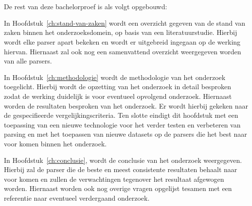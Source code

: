 \section{}
\label{sec:opzet-bachelorproef}


De rest van deze bachelorproef is als volgt opgebouwd:

In Hoofdstuk~\ref{ch:stand-van-zaken} wordt een overzicht gegeven van de stand van zaken binnen het onderzoeksdomein, op basis van een literatuurstudie. Hierbij wordt elke parser apart bekeken en wordt er uitgebreid ingegaan op de werking hiervan. Hiernaast zal ook nog een samenvattend overzicht weergegeven worden van alle parsers.

In Hoofdstuk~\ref{ch:methodologie} wordt de methodologie van het onderzoek toegelicht. Hierbij wordt de opzetting van het onderzoek in detail besproken zodat de werking duidelijk is voor eventueel opvolgend onderzoek. Hiernaast worden de resultaten besproken van het onderzoek. Er wordt hierbij gekeken naar de gespecifieerde vergelijkingscriteria. Ten slotte eindigt dit hoofdstuk met een toepassing van een nieuwe technologie voor het verder testen en verbeteren van parsing en met het toepassen van nieuwe datasets op de parsers die het best naar voor komen binnen het onderzoek.

In Hoofdstuk~\ref{ch:conclusie}, wordt de conclusie van het onderzoek weergegeven. Hierbij zal de parser die de beste en meest consistente resultaten behaalt naar voor komen en zullen de verwachtingen tegenover het resultaat afgewogen worden. Hiernaast worden ook nog overige vragen opgelijst tesamen met een referentie naar eventueel verdergaand onderzoek.
